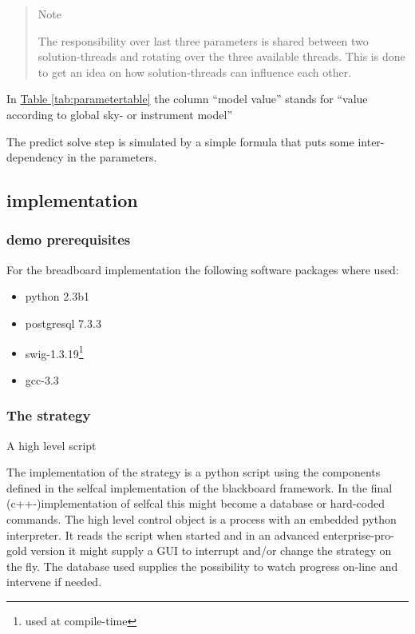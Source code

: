 \documentclass[]{lofar}
\begin{document}
      \begin{verse}{Note}

        The responsibility over last three parameters is shared
        between two solution-threads and rotating over the three
        available threads. This is done to get an idea on how
        solution-threads can influence each other.
     
      \end{verse}

      In \hyperlink{tab:parametertable}{Table \ref{tab:parametertable}} the
      column ``model value'' stands for ``value according to global
      sky- or instrument model''

      The predict solve step is simulated by a simple formula that
      puts some inter-dependency in the parameters.

    \subsection{implementation}
    \label{subsec:implementation}

      \subsubsection{demo prerequisites}
      \label{subsubsec:demo-prerequisites}

        For the breadboard implementation the following software
        packages where used:

        \begin{itemize}

          \item python 2.3b1

          \item postgresql 7.3.3

          \item swig-1.3.19\footnote{used at compile-time\label{compile-time}}

          \item gcc-3.3\footnotemark[\value{footnote}]

        \end{itemize}

      \subsubsection{The strategy}
      \label{subsubsec:stategy}
        A high level script

        The implementation of the strategy is a python script using
        the components defined in the selfcal implementation of the
        blackboard framework. In the final (c++-)implementation of
        selfcal this might become a database or hard-coded commands. The high level control object is a process with an
        embedded python interpreter. It reads the script when started
        and in an advanced enterprise-pro-gold version it might supply
        a GUI to interrupt and/or change the strategy on the fly. The
        database used supplies the possibility to watch progress
        on-line and intervene if needed.
\end{document}
